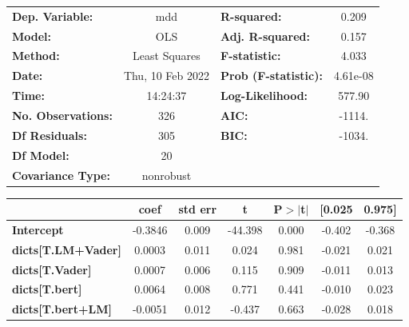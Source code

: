 \begin{center}
\begin{tabular}{lclc}
\toprule
\textbf{Dep. Variable:}              &       mdd        & \textbf{  R-squared:         } &     0.209   \\
\textbf{Model:}                      &       OLS        & \textbf{  Adj. R-squared:    } &     0.157   \\
\textbf{Method:}                     &  Least Squares   & \textbf{  F-statistic:       } &     4.033   \\
\textbf{Date:}                       & Thu, 10 Feb 2022 & \textbf{  Prob (F-statistic):} &  4.61e-08   \\
\textbf{Time:}                       &     14:24:37     & \textbf{  Log-Likelihood:    } &    577.90   \\
\textbf{No. Observations:}           &         326      & \textbf{  AIC:               } &    -1114.   \\
\textbf{Df Residuals:}               &         305      & \textbf{  BIC:               } &    -1034.   \\
\textbf{Df Model:}                   &          20      & \textbf{                     } &             \\
\textbf{Covariance Type:}            &    nonrobust     & \textbf{                     } &             \\
\bottomrule
\end{tabular}
\begin{tabular}{lcccccc}
                                     & \textbf{coef} & \textbf{std err} & \textbf{t} & \textbf{P$> |$t$|$} & \textbf{[0.025} & \textbf{0.975]}  \\
\midrule
\textbf{Intercept}                   &      -0.3846  &        0.009     &   -44.398  &         0.000        &       -0.402    &       -0.368     \\
\textbf{dicts[T.LM+Vader]}           &       0.0003  &        0.011     &     0.024  &         0.981        &       -0.021    &        0.021     \\
\textbf{dicts[T.Vader]}              &       0.0007  &        0.006     &     0.115  &         0.909        &       -0.011    &        0.013     \\
\textbf{dicts[T.bert]}               &       0.0064  &        0.008     &     0.771  &         0.441        &       -0.010    &        0.023     \\
\textbf{dicts[T.bert+LM]}            &      -0.0051  &        0.012     &    -0.437  &         0.663        &       -0.028    &        0.018     \\

\end{tabular}
\end{center}
